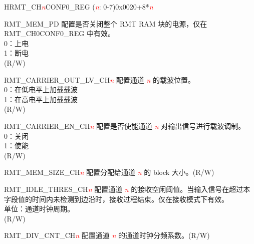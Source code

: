 \begin{register}{H}{RMT\_CH\textcolor{red}{\it{n}}CONF0\_REG (\textcolor{red}{\it{n}}: 0-7)}{0x0020+8*\textcolor{red}{\it{n}}}\label{regdesc:RMTCHnCONF0REG}
%
%
%
%
%
%
%
\regnewline%
\begin{regdesc}\begin{reglist}
\item [RMT\_MEM\_PD] 配置是否关闭整个 RMT RAM 块的电源，仅在 RMT\_CH0CONF0\_REG 中有效。\\
0：上电\\
1：断电\\ (R/W)
\item [RMT\_CARRIER\_OUT\_LV\_CH\textcolor{red}{\it{n}}] 配置通道 \textcolor{red}{\it{n}} 的载波位置。\\
0：在低电平上加载载波\\
1：在高电平上加载载波\\(R/W)
\item [RMT\_CARRIER\_EN\_CH\textcolor{red}{\it{n}}] 配置是否使能通道 \textcolor{red}{\it{n}} 对输出信号进行载波调制。\\
0：关闭\\
1：使能\\(R/W)
\item [RMT\_MEM\_SIZE\_CH\textcolor{red}{\it{n}}] 配置分配给通道 \textcolor{red}{\it{n}} 的 block 大小。(R/W)
\item [RMT\_IDLE\_THRES\_CH\textcolor{red}{\it{n}}] 配置通道 \textcolor{red}{\it{n}} 的接收空闲阈值。当输入信号在超过本字段值的时间内未检测到边沿时，接收过程结束。仅在接收模式下有效。\\
单位：通道时钟周期。\\(R/W)
\item [RMT\_DIV\_CNT\_CH\textcolor{red}{\it{n}}] 配置通道 \textcolor{red}{\it{n}} 的通道时钟分频系数。(R/W)
\end{reglist}\end{regdesc}
\end{register}


